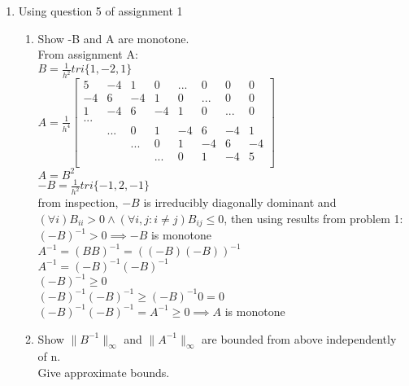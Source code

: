 \documentclass[12pt,letter]{article}
\begin{document}
\begin{enumerate}
  \pagebreak
  
\item Using question 5 of assignment 1\\
  \begin{enumerate}
  \item Show -B and A are monotone.\\
    
    From assignment A:\\
    $B=\frac{1}{h^2}tri\{1,-2,1\}$\\
    $A=\frac{1}{h^4}\begin{bmatrix}
      5 & -4 & 1 & 0 & ... & 0 & 0 & 0\\
      -4 & 6 & -4 & 1 & 0 & ... & 0 & 0\\
      1 & -4 & 6 & -4 & 1 & 0 & ... & 0\\
      ... & & & & & & &\\
      & ... & 0 & 1 & -4 & 6 & -4 & 1\\
      & & ... & 0 & 1 & -4 & 6 & -4\\
      & & & ... & 0 & 1 & -4 & 5\\
    \end{bmatrix}$\\
    $A=B^2$\\
    $-B=\frac{1}{h^2}tri\{-1,2,-1\}$\\
    
    from inspection, $-B$ is irreducibly diagonally dominant and \\
    $(\forall i)B_{ii}>0 \wedge (\forall i,j: i \neq j)B_{ij} \leq 0$, then using results from problem 1:\\
    $(-B)^{-1}>0 \implies -B$ is monotone\\
    
    $A^{-1}=(BB)^{-1}=((-B)(-B))^{-1}$\\
    $A^{-1}=(-B)^{-1}(-B)^{-1}$\\
    $(-B)^{-1} \geq 0$\\
    $(-B)^{-1}(-B)^{-1} \geq (-B)^{-1}0=0$\\
    $(-B)^{-1}(-B)^{-1}=A^{-1} \geq 0 \implies A$ is monotone\\

    \pagebreak
    
  \item Show $\|B^{-1}\|_{\infty}$ and $\|A^{-1}\|_{\infty}$ are bounded from above independently of n.\\ Give approximate bounds.\\
    

\end{enumerate}
\end{enumerate}
\end{document}

